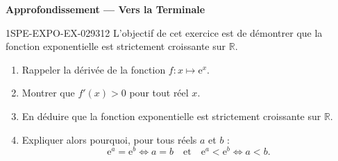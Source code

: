 \begin{center}\textbf{Approfondissement — Vers la Terminale}\end{center}
\begin{exercice}{1SPE-EXPO-EX-029}{3}{12}
L'objectif de cet exercice est de démontrer que la fonction exponentielle est strictement croissante sur $\mathbb{R}$.
\begin{enumerate}
  \item Rappeler la dérivée de la fonction $f : x \mapsto \mathrm{e}^x$.
  \item Montrer que $f'(x) > 0$ pour tout réel $x$.
  \item En déduire que la fonction exponentielle est strictement croissante sur $\mathbb{R}$.
  \item Expliquer alors pourquoi, pour tous réels $a$ et $b$ :
  \[\mathrm{e}^a = \mathrm{e}^b \iff a = b \quad \text{et} \quad \mathrm{e}^a < \mathrm{e}^b \iff a < b.\]
\end{enumerate}
\end{exercice}
